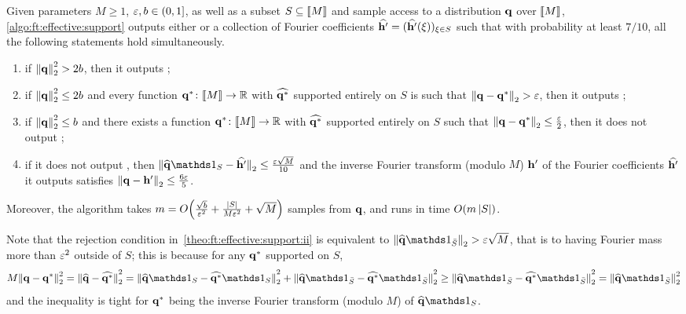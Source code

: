 \begin{theorem}\label{theo:ft:effective:support}
    Given parameters $M\geq 1$, $\varepsilon,b\in(0,1]$, as well as a subset $S\subseteq \llbracket M\rrbracket$ and sample access to a distribution $\mathbf{q}$ over $\llbracket M\rrbracket$, \cref{algo:ft:effective:support} outputs either \reject or a collection of Fourier coefficients $\widehat{\mathbf{h}'}=(\widehat{\mathbf{h}'}(\xi))_{\xi\in S}$ such that with probability at least $7/10$, all the following statements hold simultaneously.
    \begin{enumerate}
        \item\label{theo:ft:effective:support:i} if ${\lVert\mathbf{q}{\rVert}}_2^2 > 2b$, then it outputs \reject;
        \item\label{theo:ft:effective:support:ii} if ${\lVert\mathbf{q}{\rVert}}_2^2 \leq 2b$ and every function $\mathbf{q}^\ast\colon\llbracket M\rrbracket\to\mathbb{R}$ with $\widehat{\mathbf{q}^\ast}$ supported entirely on $S$ is such that ${\lVert\mathbf{q}-\mathbf{q}^\ast{\rVert}}_2 > \varepsilon$, then it outputs \reject;
        \item\label{theo:ft:effective:support:iii} if ${\lVert\mathbf{q}{\rVert}}_2^2 \leq b$ and there exists a function $\mathbf{q}^\ast\colon\llbracket M\rrbracket\to\mathbb{R}$ with $\widehat{\mathbf{q}^\ast}$ supported entirely on $S$ such that ${\lVert\mathbf{q}-\mathbf{q}^\ast{\rVert}}_2 \leq \frac{\varepsilon}{2}$, then it does not output \reject;
        \item\label{theo:ft:effective:support:iv} if it does not output \reject, then $\normtwo{\fourier{\q}\indicSet{S}-\fourier{\h'}} \leq \frac{\eps\sqrt{M}}{10}$ and the inverse Fourier transform (modulo $M$) $\mathbf{h}'$ of the Fourier coefficients $\widehat{\mathbf{h}'}$ it outputs satisfies ${\lVert\mathbf{q}-\mathbf{h}'{\rVert}}_2 \leq \frac{6\varepsilon}{5}$.
    \end{enumerate}
    Moreover, the algorithm takes $m=\bigO{\frac{\sqrt{b}}{\eps^2}+ \frac{\abs{S}}{M\eps^2} +\sqrt{M}}$ samples from $\mathbf{q}$, and runs in time $\bigO{m\abs{S}}$.
\end{theorem}
Note that the rejection condition in~\cref{theo:ft:effective:support:ii} is equivalent to $\normtwo{\fourier{\q}\indicSet{\bar{S}}} > \eps\sqrt{M}$, that is to having Fourier mass more than $\varepsilon^2$ outside of $S$; this is because for any $\mathbf{q}^\ast$ supported on $S$,
\[
    M\normtwo{\q-\q^\ast}^2 = \normtwo{\fourier{\q}-\fourier{\q^\ast}}^2
    = \normtwo{\fourier{\q}\indicSet{S}-\fourier{\q^\ast}\indicSet{S}}^2 + \normtwo{\fourier{\q}\indicSet{\bar{S}}-\fourier{\q^\ast}\indicSet{\bar{S}}}^2
    \geq \normtwo{\fourier{\q}\indicSet{\bar{S}}-\fourier{\q^\ast}\indicSet{\bar{S}}}^2
    = \normtwo{\fourier{\q}\indicSet{\bar{S}}}^2
\]
and the inequality is tight for $\mathbf{q}^\ast$ being the inverse Fourier transform (modulo $M$) of $\fourier{\q}\indicSet{S}$.

